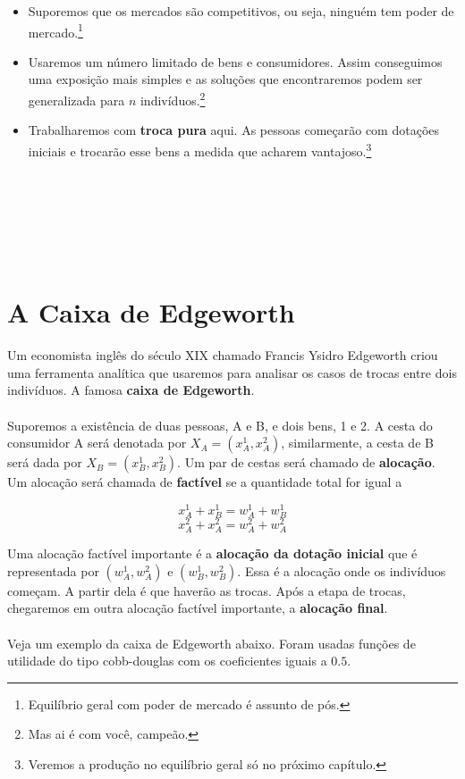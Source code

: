 \documentclass[a4paper,11pt,oneside]{book}
\theoremstyle{definition}
\theoremstyle{break}
\begin{document}
\begin{itemize}
\item Suporemos que os mercados são competitivos, ou seja, ninguém tem poder de mercado.\footnote{Equilíbrio geral com poder de mercado é assunto de pós.}
\item Usaremos um número limitado de bens e consumidores. Assim conseguimos uma exposição mais simples e as soluções que encontraremos podem ser generalizada para $n$ indivíduos.\footnote{Mas ai é com você, campeão.}
\item Trabalharemos com \textbf{troca pura} aqui. As pessoas começarão com dotações iniciais e trocarão esse bens a medida que acharem vantajoso.\footnote{Veremos a produção no equilíbrio geral só no próximo capítulo.}
\end{itemize}

\ 
\\~\\
\ 
\\~\\
\ 
\section{A Caixa de Edgeworth}

Um economista inglês do século XIX chamado Francis Ysidro Edgeworth criou uma ferramenta analítica que usaremos para analisar os casos de trocas entre dois indivíduos. A famosa \textbf{caixa de Edgeworth}.
\\~\\
Suporemos a existência de duas pessoas, A e B, e dois bens, 1 e 2. A cesta do consumidor A será denotada por $X_A = (x_A^1, x_A^2)$, similarmente, a cesta de B será dada por $X_B = (x_B^1, x_B^2)$. Um par de cestas será chamado de \textbf{alocação}. Um alocação será chamada de \textbf{factível} se a quantidade total for igual a 

$$x_A^1 + x_B^1 = w_A^1 + w_B^1$$
$$x_A^2 + x_A^2 = w_A^2 + w_A^2$$

Uma alocação factível importante é a \textbf{alocação da dotação inicial} que é representada por $(w_A^1, w_A^2)$ e $(w_B^1, w_B^2)$. Essa é a alocação onde os indivíduos começam. A partir dela é que haverão as trocas. Após a etapa de trocas, chegaremos em outra alocação factível importante, a \textbf{alocação final}.
\\~\\
Veja um exemplo da caixa de Edgeworth abaixo. Foram usadas funções de utilidade do tipo cobb-douglas com os coeficientes iguais a $0.5$.
\end{document}
